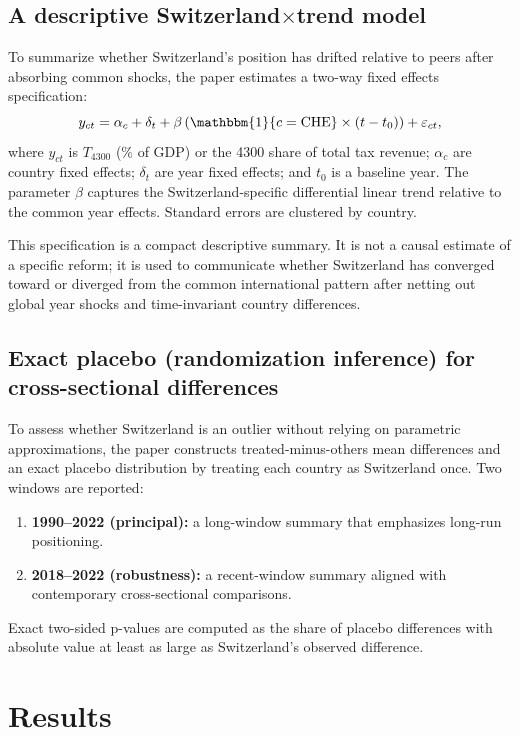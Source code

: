 \documentclass[11pt,a4paper]{article}
\begin{document}
\subsection{A descriptive \texorpdfstring{Switzerland$\times$trend}{Switzerland x trend} model}
To summarize whether Switzerland's position has drifted relative to peers after absorbing common shocks, the paper estimates a two-way fixed effects specification:
\[
 y_{ct} = \alpha_c + \delta_t + \beta \left(\mathbbm{1}\{c=\text{CHE}\} \times (t - t_0)\right) + \varepsilon_{ct},
\]
where $y_{ct}$ is $T_{4300}$ (\% of GDP) or the 4300 share of total tax revenue; $\alpha_c$ are country fixed effects; $\delta_t$ are year fixed effects; and $t_0$ is a baseline year. The parameter $\beta$ captures the Switzerland-specific differential linear trend relative to the common year effects. Standard errors are clustered by country.

This specification is a compact descriptive summary. It is not a causal estimate of a specific reform; it is used to communicate whether Switzerland has converged toward or diverged from the common international pattern after netting out global year shocks and time-invariant country differences.

\subsection{Exact placebo (randomization inference) for cross-sectional differences}
To assess whether Switzerland is an outlier without relying on parametric approximations, the paper constructs treated-minus-others mean differences and an exact placebo distribution by treating each country as Switzerland once. Two windows are reported:
\begin{enumerate}
  \item \textbf{1990--2022 (principal):} a long-window summary that emphasizes long-run positioning.
  \item \textbf{2018--2022 (robustness):} a recent-window summary aligned with contemporary cross-sectional comparisons.
\end{enumerate}
Exact two-sided p-values are computed as the share of placebo differences with absolute value at least as large as Switzerland's observed difference.

\section{Results}
\label{sec:results}
\end{document}
